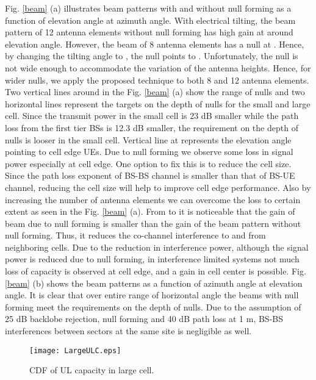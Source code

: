 \documentclass[twocolumn]{IEEEtran}
\begin{document}
Fig. \ref{beam} (a) illustrates beam patterns with and without null
forming as a function of elevation angle at  azimuth
angle. With  electrical tilting, the beam pattern of 12
antenna elements without null forming has high gain at around
 elevation angle. However, the beam of 8 antenna elements
has a null at . Hence, by changing the tilting angle to
, the null points to . Unfortunately, the null
is not wide enough to accommodate the variation of the antenna
heights. Hence, for wider nulls, we apply the proposed technique to
both 8 and 12 antenna elements. Two vertical lines around 
in the Fig. \ref{beam} (a) show the range of nulls and two
horizontal lines represent the targets on the depth of nulls for the
small and large cell. Since the transmit power in the small cell is
23 dB smaller while the path loss from the first tier BSs is 12.3 dB
smaller, the requirement on the depth of nulls is looser in the
small cell. Vertical line at  represents the elevation
angle pointing to cell edge UEs. Due to null forming we observe some
loss in signal power especially at cell edge. One option to fix this
is to reduce the cell size. Since the path loss exponent of BS-BS
channel is smaller than that of BS-UE channel, reducing the cell
size will help to improve cell edge performance. Also by increasing
the number of antenna elements we can overcome the loss to certain
extent as seen in the Fig. \ref{beam} (a). From  to
 it is noticeable that the gain of beam due to null
forming is smaller than the gain of the beam pattern without null
forming. Thus, it reduces the co-channel interference to and from
neighboring cells. Due to the reduction in interference power,
although the signal power is reduced due to null forming, in
interference limited systems not much loss of capacity is observed
at cell edge, and a gain in cell center is possible. Fig. \ref{beam}
(b) shows the beam patterns as a function of azimuth angle at
 elevation angle. It is clear that over entire range of
horizontal angle the beams with null forming meet the requirements
on the depth of nulls. Due to the assumption of 25 dB backlobe
rejection, null forming and 40 dB path loss at 1 m, BS-BS
interferences between sectors at the same site is negligible as
well.

\begin{figure}[!t]

\centering
    {\texttt{[image: LargeULC.eps]}}

\caption{CDF of UL capacity in large cell. \label{BSBSLarge} }

\end{figure}
\end{document}
